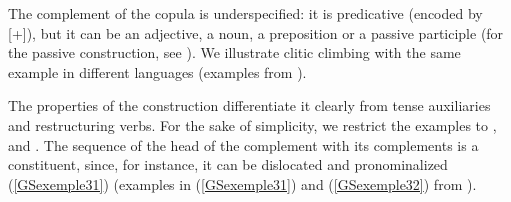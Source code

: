 The complement of the copula is underspecified: it is predicative (encoded by [\prd +]), but it can be an adjective, a noun, a preposition or a passive participle (for the passive construction, see \citealt{AG2002b-u}). We illustrate clitic climbing with the same example in different  languages (examples from \citealt[120]{AG2010}).

\eal
	\label{GSexemple30} 
	\label{GSexemple30a}

	\label{GSexemple30b}
		
	\label{GSexemple30c}
		
	\label{GSexemple30d}
		
	\label{GSexemple30e}
		
	\label{GSexemple30f}
\zl

\noindent
The properties of the construction differentiate it clearly from tense auxiliaries and restructuring verbs. For the sake of simplicity, we restrict the examples to ,  and . The sequence of the head of the complement with its complements is a constituent, since, for instance, it can be dislocated and pronominalized (\ref{GSexemple31}) (examples in (\ref{GSexemple31}) and (\ref{GSexemple32}) from \citealt[133-134]{AG2010}).

